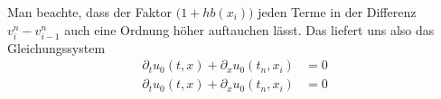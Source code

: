 Man beachte, dass der Faktor $\bigl(1 + h b(x_i)\bigr)$ jeden Terme in der
Differenz $v^n_i - v^n_{i-1}$ auch eine Ordnung höher auftauchen lässt. Das
liefert uns also das Gleichungssystem
\begin{align}\label{eq:varadv:kleina:oh}
\partial_t u_0(t, x) + \partial_x u_0(t_n, x_i) &= 0\\
\partial_t u_0(t, x) + \partial_x u_0(t_n, x_i) &= 0
\end{align}